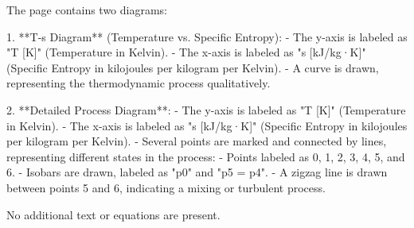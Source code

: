 The page contains two diagrams:  

1. **T-s Diagram** (Temperature vs. Specific Entropy):  
   - The y-axis is labeled as "T [K]" (Temperature in Kelvin).  
   - The x-axis is labeled as "s [kJ/kg·K]" (Specific Entropy in kilojoules per kilogram per Kelvin).  
   - A curve is drawn, representing the thermodynamic process qualitatively.  

2. **Detailed Process Diagram**:  
   - The y-axis is labeled as "T [K]" (Temperature in Kelvin).  
   - The x-axis is labeled as "s [kJ/kg·K]" (Specific Entropy in kilojoules per kilogram per Kelvin).  
   - Several points are marked and connected by lines, representing different states in the process:  
     - Points labeled as 0, 1, 2, 3, 4, 5, and 6.  
     - Isobars are drawn, labeled as "p0" and "p5 = p4".  
     - A zigzag line is drawn between points 5 and 6, indicating a mixing or turbulent process.  

No additional text or equations are present.